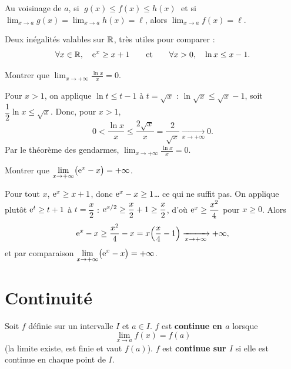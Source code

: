 \begin{theoreme}
	Au voisinage de $a$, si $\;g(x)\leq f(x)\leq h(x)\;$ et si
	$\displaystyle\lim_{x\to a}g(x)=\lim_{x\to a}h(x)=\ell$, alors
	$\displaystyle\lim_{x\to a}f(x)=\ell$.
\end{theoreme}

\begin{astucebac}
	Deux inégalités valables sur $\mathbb{R}$, très utiles pour comparer :
	\[
	\forall x\in\mathbb{R},\quad \mathrm{e}^x\geq x+1
	\qquad\text{et}\qquad
	\forall x>0,\quad \ln x\leq x-1 .
	\]
\end{astucebac}

\begin{exemple}
	Montrer que $\displaystyle\lim_{x\to+\infty}\frac{\ln x}{x}=0$.

	Pour $x>1$, on applique $\ln t\leq t-1$ à $t=\sqrt{x}$ :
	$\ln\sqrt{x}\leq\sqrt{x}-1$, soit $\dfrac{1}{2}\ln x\leq\sqrt{x}$.
	Donc, pour $x>1$,
	\[
	0<\frac{\ln x}{x}\leq\frac{2\sqrt{x}}{x}=\frac{2}{\sqrt{x}}
	\xrightarrow[x\to+\infty]{}0 .
	\]
	Par le théorème des gendarmes, $\displaystyle\lim_{x\to+\infty}\frac{\ln x}{x}=0$.
\end{exemple}

\begin{exemple}
	Montrer que $\displaystyle\lim_{x\to+\infty}\bigl(\mathrm{e}^x-x\bigr)=+\infty$.

	Pour tout $x$, $\mathrm{e}^x\geq x+1$, donc $\mathrm{e}^x-x\geq 1$… ce qui ne suffit pas.
	On applique plutôt $\mathrm{e}^t\geq t+1$ à $t=\dfrac{x}{2}$ :
	$\mathrm{e}^{x/2}\geq\dfrac{x}{2}+1\geq\dfrac{x}{2}$, d'où $\mathrm{e}^{x}\geq\dfrac{x^2}{4}$
	pour $x\geq 0$. Alors
	\[
	\mathrm{e}^x-x\geq\frac{x^2}{4}-x=x\!\left(\frac{x}{4}-1\right)
	\xrightarrow[x\to+\infty]{}+\infty ,
	\]
	et par comparaison $\displaystyle\lim_{x\to+\infty}\bigl(\mathrm{e}^x-x\bigr)=+\infty$.
\end{exemple}


\section{Continuité}

\begin{definition}
	Soit $f$ définie sur un intervalle $I$ et $a\in I$.
	$f$ est \textbf{continue en $a$} lorsque
	\[
	\lim_{x\to a}f(x)=f(a)
	\]
	(la limite existe, est finie et vaut $f(a)$).
	$f$ est \textbf{continue sur $I$} si elle est continue en chaque point de $I$.
\end{definition}


